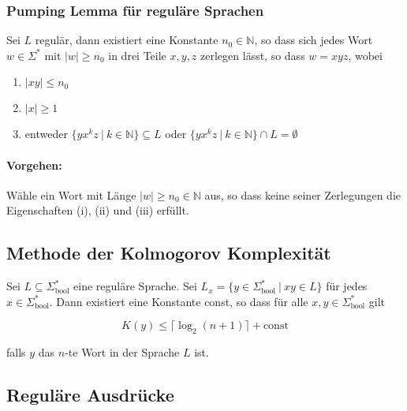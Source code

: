 \documentclass[11pt]{article}
\begin{document}
\subsubsection{Pumping Lemma f{\"u}r regul{\"a}re Sprachen}

Sei $L$ regul{\"a}r, dann existiert eine Konstante $n_0 \in \mathbb{N}$, so dass sich jedes Wort $w \in \Sigma^*$ mit $|w| \geq n_0$ in drei Teile $x, y, z$ zerlegen l{\"a}sst, so dass $w = xyz$, wobei

\begin{enumerate}[label=(\roman*), noitemsep]
	\item $|xy| \leq n_0$
	\item $|x| \geq 1$
	\item entweder $\{yx^kz\ |\ k \in \mathbb{N}\} \subseteq L$ oder $\{yx^kz\ |\ k \in \mathbb{N}\} \cap L = \emptyset$
\end{enumerate}

\paragraph{Vorgehen:} W{\"a}hle ein Wort mit L{\"a}nge $|w| \geq n_0 \in \mathbb{N}$ aus, so dass keine seiner Zerlegungen die Eigenschaften (i), (ii) und (iii) erf{\"u}llt.

\subsection{Methode der Kolmogorov Komplexit{\"a}t}

Sei $L \subseteq \Sigma_\text{bool}^*$ eine regul{\"a}re Sprache. Sei $L_x = \{y \in \Sigma_\text{bool}^*\ |\ xy \in L\}$ f{\"u}r jedes $x \in \Sigma_\text{bool}^*$. Dann existiert eine Konstante const, so dass f{\"u}r alle $x,y \in \Sigma_\text{bool}^*$ gilt

\begin{equation*}
	K(y) \leq \lceil\log_2(n+1)\rceil + \text{const}
\end{equation*}

falls $y$ das $n$-te Wort in der Sprache $L$ ist.

\subsection{Reguläre Ausdrücke}
\end{document}
